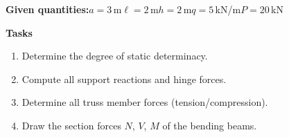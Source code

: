 \documentclass[a4paper,11pt]{article}
\begin{document}
\textbf{Given quantities:}\quad $a=3$\,m\quad $\ell=2$\,m\quad $h=2$\,m\quad $q=5$\,kN/m\quad $P=20$\,kN
\par\medskip
\textbf{Tasks}\par
\begin{enumerate}[label=\textbf{\arabic*.}]
  \item Determine the degree of static determinacy.
  \item Compute all support reactions and hinge forces.
  \item Determine all truss member forces (tension/compression).
  \item Draw the section forces $N$, $V$, $M$ of the bending beams.
\end{enumerate}
\end{document}
